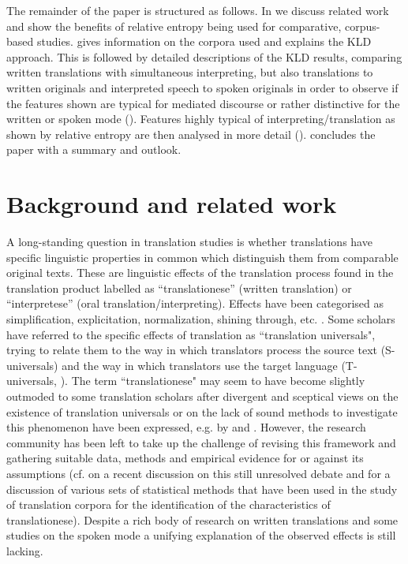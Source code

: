 \documentclass[output=paper,colorlinks,citecolor=brown]{langscibook}
\begin{document}
The remainder of the paper is structured as follows. In  we discuss related work and show the benefits of relative entropy being used for comparative, cor\-pus-based studies.  gives information on the corpora used and explains the KLD approach. This is followed by detailed descriptions of the KLD results, comparing written translations with simultaneous interpreting, but also translations to written originals and interpreted speech to spoken originals in order to observe if the features shown are typical for mediated discourse or rather distinctive for the written or spoken mode (). Features highly typical of interpreting\slash translation as shown by relative entropy are then analysed in more detail ().  concludes the paper with a summary and outlook.

\section{Background and related work}\label{background}

A long-standing question in translation studies is whether translations have specific linguistic properties in common which distinguish them from comparable original texts. These are linguistic effects of the translation process found in the translation product labelled as “translationese” (written translation) or “interpretese” (oral translation/interpreting). Effects  have been categorised as simplification, explicitation, normalization, shining through, etc. \citep{Baker1993,Laviosa1998,Teich2003}. Some scholars have referred to the specific effects of translation as “translation universals", trying to relate them to the way in which translators process the source text (S-universals) and the way in which translators use the target language (T-universals,   \citealt[39]{Chesterman2004}). The term “translationese" may seem to have become slightly outmoded to some translation scholars after divergent and sceptical views on the existence of translation universals or on the lack of sound methods to investigate this phenomenon have been expressed, e.g. by \citet{Becher2010} and \citet{House2008}. However, the research community has been left to take up the challenge of revising this framework and gathering suitable data, methods and empirical evidence for or against its assumptions (cf. \citealt[22ff]{Vandevoorde2020} on a recent discussion on this still unresolved debate and \citet{Oakes2021} for a discussion of various sets of statistical methods that have been used in the study of translation corpora for the identification of the characteristics of translationese). Despite a rich body of research on written translations \citep{Schirra2013,Lapshinova-Koltunski2015,EvertNeumann2017} and some studies on the spoken mode \citep{SandrelliBendazzoli2005,KajzerWietrzny2012,ShlesingerOrdan2012,BernardiniEtAl2016,HeEtAl2016,Dayter2018} a unifying explanation of the observed effects is still lacking.
\end{document}
